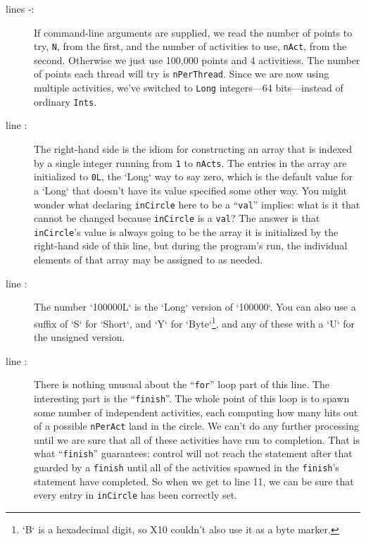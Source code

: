 \begin{description}
\item[lines -:] 
If command-line arguments are supplied, we read the number of points to try, {\tt N},
from the first, and
the number of activities to use, {\tt nAct}, from the second.  Otherwise we just use
100,000 points and 4 activitiess. The number of points each thread will try is {\tt nPerThread}.  Since we
are now using multiple activities, we've switched to {\tt Long} integers---64
bits---instead of ordinary {\tt Ints}.
\item[line :]
The right-hand side is the \Xten{} idiom for constructing an array that is indexed
by a single integer running from {\tt 1} to {\tt nActs}.  
The
entries in the array are initialized to {\tt 0L}, the \xcd`Long` way to say
zero, which is the default value for a \xcd`Long` that doesn't have its value
specified some other way.
You might wonder what
declaring {\tt inCircle} here to be a ``{\tt val}'' implies: what is
it that cannot be changed because {\tt inCircle} is a {\tt val}?  The answer
is that {\tt inCircle}'s value is always going to be the array it is initialized
by the right-hand side of this line, but during the program's run, the individual
elements of that array may be assigned to as needed.

\item [line :] The number \xcd`100000L` is the \xcd`Long`
      version of \xcd`100000`.  You can also use a suffix of \xcd`S` for
      \xcd`Short`, and \xcd`Y` for \xcd`Byte`\footnote{\xcd`B` is a
      hexadecimal digit, so X10 couldn't also use it as a byte marker.}, and
      any of these with a \xcd`U` 
      for the unsigned version.



\item[line :] There is nothing unusual about the ``{\tt for}'' loop part of
this line. The interesting part is the ``{\tt finish}''.  The whole
point of this loop is to spawn some number of
independent activities, each computing how many hits
out of a possible  {\tt nPer\-Act} land in the circle.  We can't do any
further processing until we are sure that all of these activities have run to
completion.  That is what ``{\tt finish}'' guarantees: control will not reach
the statement after that guarded by a {\tt finish} until all of the activities
spawned in the {\tt finish}'s statement have completed.  So when we get to line
11, we can be sure that every entry in {\tt inCircle} has been correctly set.


\end{description}
